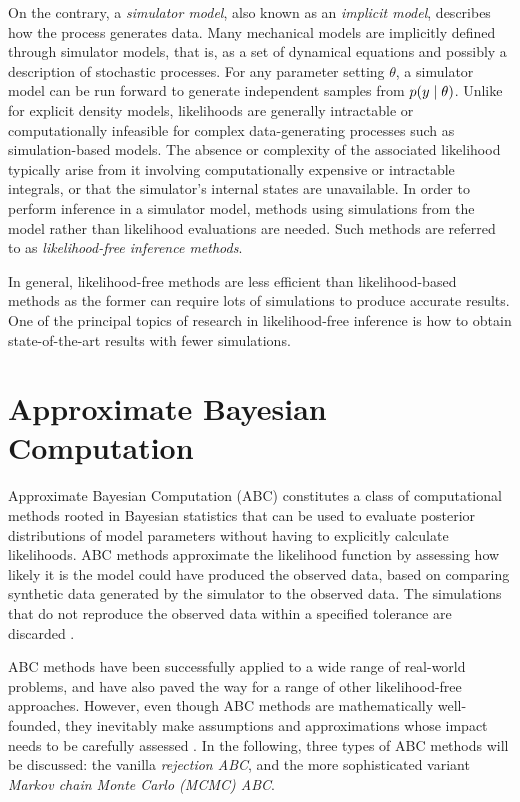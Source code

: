 On the contrary, a \textit{simulator model}, also known as an \textit{implicit model}, describes how the process generates data. Many mechanical models are implicitly defined through simulator models, that is, as a set of dynamical equations and possibly a description of stochastic processes. For any parameter setting $\theta$, a simulator model can be run forward to generate independent samples from $p \qty(y \mid \theta)$. Unlike for explicit density models, likelihoods are generally intractable or computationally infeasible for complex data-generating processes such as simulation-based models. The absence or complexity of the associated likelihood typically arise from it involving computationally expensive or intractable integrals, or that the simulator's internal states are unavailable. In order to perform inference in a simulator model, methods using simulations from the model rather than likelihood evaluations are needed. Such methods are referred to as \textit{likelihood-free inference methods}.

In general, likelihood-free methods are less efficient than likelihood-based methods as the former can require lots of simulations to produce accurate results. One of the principal topics of research in likelihood-free inference is how to obtain state-of-the-art results with fewer simulations. 

\section{Approximate Bayesian Computation}\label{sec:abc}

Approximate Bayesian Computation (ABC) constitutes a class of computational methods rooted in Bayesian statistics that can be used to evaluate posterior distributions of model parameters without having to explicitly calculate likelihoods. ABC methods approximate the likelihood function by assessing how likely it is the model could have produced the observed data, based on comparing synthetic data generated by the simulator to the observed data. The simulations that do not reproduce the observed data within a specified tolerance are discarded \cite{ABCprimer}.

ABC methods have been successfully applied to a wide range of real-world problems, and have also paved the way for a range of other likelihood-free approaches. However, even though ABC methods are mathematically well-founded, they inevitably make assumptions and approximations whose impact needs to be carefully assessed \cite{ABCprimer}. In the following, three types of ABC methods will be discussed: the vanilla \textit{rejection ABC}, and the more sophisticated variant \textit{Markov chain Monte Carlo (MCMC) ABC}.

